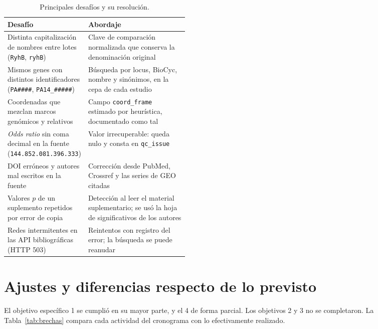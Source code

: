 \documentclass[11pt,a4paper]{article}
\begin{document}
\begin{table}[htbp]
\centering\small
\caption{Principales desafíos y su resolución.}
\label{tab:desafios}
\begin{tabularx}{\linewidth}{>{\raggedright\arraybackslash}p{0.42\linewidth} Y}
\toprule
Desafío & Abordaje\\
\midrule
Distinta capitalización de nombres entre lotes (\texttt{RyhB}, \texttt{ryhB}) & Clave de comparación normalizada que conserva la denominación original\\
Mismos genes con distintos identificadores (\texttt{PA\#\#\#\#}, \texttt{PA14\_\#\#\#\#\#}) & Búsqueda por locus, BioCyc, nombre y sinónimos, en la cepa de cada estudio\\
Coordenadas que mezclan marcos genómicos y relativos & Campo \texttt{coord\_frame} estimado por heurística, documentado como tal\\
\emph{Odds ratio} sin coma decimal en la fuente (\texttt{144.852.081.396.333}) & Valor irrecuperable: queda nulo y consta en \texttt{qc\_issue}\\
DOI erróneos y autores mal escritos en la fuente & Corrección desde PubMed, Crossref y las series de GEO citadas\\
Valores $p$ de un suplemento repetidos por error de copia & Detección al leer el material suplementario; se usó la hoja de significativos de los autores\\
Redes intermitentes en las API bibliográficas (HTTP 503) & Reintentos con registro del error; la búsqueda se puede reanudar\\
\bottomrule
\end{tabularx}
\end{table}

\section{Ajustes y diferencias respecto de lo previsto}

El objetivo específico 1 se cumplió en su mayor parte, y el 4 de forma parcial. Los objetivos 2 y 3 no se completaron. La Tabla~\ref{tab:brechas} compara cada actividad del cronograma con lo efectivamente realizado.
\end{document}
